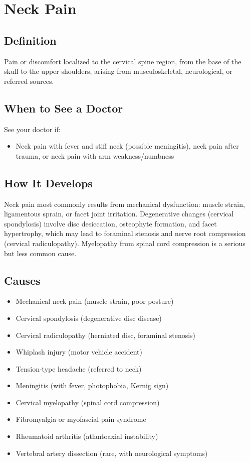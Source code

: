 \chapter{Neck Pain}

\section*{Definition}
Pain or discomfort localized to the cervical spine region, from the base of the skull to the upper shoulders, arising from musculoskeletal, neurological, or referred sources.

\section*{When to See a Doctor}
See your doctor if:
\begin{itemize}
  \item Neck pain with fever and stiff neck (possible meningitis), neck pain after trauma, or neck pain with arm weakness/numbness
\end{itemize}

\section*{How It Develops}
Neck pain most commonly results from mechanical dysfunction: muscle strain, ligamentous sprain, or facet joint irritation. Degenerative changes (cervical spondylosis) involve disc desiccation, osteophyte formation, and facet hypertrophy, which may lead to foraminal stenosis and nerve root compression (cervical radiculopathy). Myelopathy from spinal cord compression is a serious but less common cause.

\section*{Causes}
\begin{itemize}
  \item Mechanical neck pain (muscle strain, poor posture)
  \item Cervical spondylosis (degenerative disc disease)
  \item Cervical radiculopathy (herniated disc, foraminal stenosis)
  \item Whiplash injury (motor vehicle accident)
  \item Tension-type headache (referred to neck)
  \item Meningitis (with fever, photophobia, Kernig sign)
  \item Cervical myelopathy (spinal cord compression)
  \item Fibromyalgia or myofascial pain syndrome
  \item Rheumatoid arthritis (atlantoaxial instability)
  \item Vertebral artery dissection (rare, with neurological symptoms)
\end{itemize}

